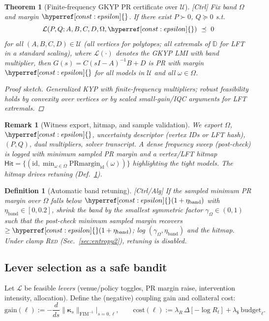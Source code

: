 \documentclass[10pt]{article}
\newcommand{\FIM}{\mathrm{FIM}}
\newenvironment{proofsketch}{\begin{proof}[Proof sketch]}{\end{proof}}
\newcommand{\layertag}[1]{\textup{[#1]}}
\newcommand{\constref}[1]{\hyperref[const:#1]{\ensuremath{\csname constsym#1\endcsname}}}
\newtheorem{theorem}{Theorem}
\newtheorem{definition}{Definition}
\newtheorem{remark}{Remark}
\begin{document}
\begin{theorem}[Finite-frequency GKYP PR certificate over $\mathcal U$]\label{thm:gkyp-unc}
\emph{\layertag{Ctrl}}
Fix band $\Omega$ and margin $\constref{epsilon}$. If there exist $P\succ0$, $Q\succeq0$ s.t.
\[
\mathcal L(P,Q;A,B,C,D,\Omega,\constref{epsilon}) \ \preceq\ 0
\]
for all $(A,B,C,D)\in\mathcal U$ (all vertices for polytopes; all extremals of $\mathbb D$ for LFT in a standard scaling), where $\mathcal L(\cdot)$ denotes the GKYP LMI with band multiplier, then $G(s)=C(sI-A)^{-1}B+D$ is PR with margin $\constref{epsilon}$ for all models in $\mathcal U$ and all $\omega\in\Omega$.
\begin{proofsketch}
Generalized KYP with finite-frequency multipliers; robust feasibility holds by convexity over vertices or by scaled small-gain/IQC arguments for LFT extremals.
\end{proofsketch}
\end{theorem}

\begin{remark}[Witness export, hitmap, and sample validation]\label{rem:hitmap}
We export $\Omega$, $\constref{epsilon}$, uncertainty descriptor (vertex IDs or LFT hash), $(P,Q)$, dual multipliers, solver transcript. A dense frequency sweep (post-check) is logged with minimum sampled PR margin and a \emph{vertex/LFT hitmap} $\mathsf{Hit}=\{(\text{id}, \min_{\omega\in\Omega}\text{PRmargin}_{\text{id}}(\omega))\}$ highlighting the tight models. The hitmap drives retuning (Def.~\ref{def:band-retune}).
\end{remark}

\begin{definition}[Automatic band retuning]\label{def:band-retune}
\emph{\layertag{Ctrl/Alg}}
If the sampled minimum PR margin over $\Omega$ falls below $\constref{epsilon}(1+\eta_{\mathrm{band}})$ with $\eta_{\mathrm{band}}\in[0,0.2]$, \emph{shrink} the band by the smallest symmetric factor $\gamma_\Omega\in(0,1)$ such that the post-check minimum sampled margin recovers $\ge \constref{epsilon}(1+\eta_{\mathrm{band}})$; log $(\gamma_\Omega,\eta_{\mathrm{band}})$ and the hitmap. Under clamp \textsc{Red} (Sec.~\ref{sec:entropy2}), retuning is disabled.
\end{definition}

\subsection*{Lever selection as a safe bandit}\label{sec:ctrl2-bandit}
Let $\mathcal L$ be feasible \emph{levers} (venue/policy toggles, PR margin raise, intervention intensity, allocation). Define the (negative) coupling gain and collateral cost:
\[
\mathrm{gain}(\ell) := -\frac{d}{ds}\Big\|\bm\kappa_s\Big\|_{\FIM^{-1}}\!\Big|_{s=0,\ell},\qquad
\mathrm{cost}(\ell) := \lambda_R\,\Delta[-\log R_t] + \lambda_{\$}\,\text{budget}_\ell.
\]
\end{document}
